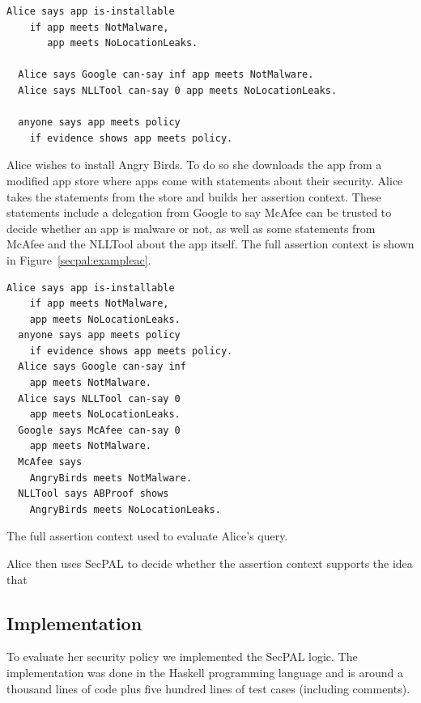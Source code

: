 \documentclass[a4paper,sfsidenotes]{tufte-book}
\begin{document}
\begin{lstlisting}[language=SecPAL]
  Alice says app is-installable 
    if app meets NotMalware, 
       app meets NoLocationLeaks.

  Alice says Google can-say inf app meets NotMalware.
  Alice says NLLTool can-say 0 app meets NoLocationLeaks.

  anyone says app meets policy
    if evidence shows app meets policy.
\end{lstlisting}

Alice wishes to install Angry Birds. To do so she downloads the app from a
modified app store where apps come with statements about their security.  Alice
takes the statements from the store and builds her assertion context.  These
statements include a delegation from Google to say McAfee can be trusted to
decide whether an app is malware or not, as well as some statements from McAfee
and the NLLTool about the app itself. The full assertion context is shown in
Figure~\ref{secpal:exampleac}.

\begin{marginfigure}\label{secpal:exampleac}
\begin{lstlisting}[language=SecPAL]
  Alice says app is-installable 
    if app meets NotMalware, 
    app meets NoLocationLeaks.
  anyone says app meets policy 
    if evidence shows app meets policy.
  Alice says Google can-say inf 
    app meets NotMalware.
  Alice says NLLTool can-say 0 
    app meets NoLocationLeaks.
  Google says McAfee can-say 0 
    app meets NotMalware.
  McAfee says 
    AngryBirds meets NotMalware.
  NLLTool says ABProof shows 
    AngryBirds meets NoLocationLeaks.
\end{lstlisting}
\caption{The full assertion context used to evaluate Alice's query.}
\end{marginfigure}

Alice then uses SecPAL to decide whether the assertion context supports
the idea that 

\subsection{Implementation}

To evaluate her security policy we implemented the SecPAL logic.
The implementation was done in the Haskell programming language and is around a
thousand lines of code plus five hundred lines of test cases (including
comments).
\end{document}
